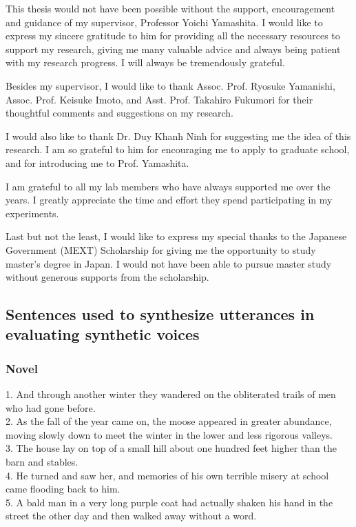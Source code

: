 \documentclass[12pt]{article}
\begin{document}
\clearpage
\acknowledgements
This thesis would not have been possible without the support, encouragement and guidance of my supervisor, Professor Yoichi Yamashita. I would like to express my sincere gratitude to him for providing all the necessary resources to support my research, giving me many valuable advice and always being patient with my research progress. I will always be tremendously grateful.

Besides my supervisor, I would like to thank Assoc. Prof. Ryosuke Yamanishi, Assoc. Prof. Keisuke Imoto, and Asst. Prof. Takahiro Fukumori for their thoughtful comments and suggestions on my research.

I would also like to thank Dr. Duy Khanh Ninh for suggesting me the idea of this research. I am so grateful to him for encouraging me to apply to graduate school, and for introducing me to Prof. Yamashita.

I am grateful to all my lab members who have always supported me over the years. I greatly appreciate the time and effort they spend participating in my experiments.

Last but not the least, I would like to express my special thanks to the Japanese Government (MEXT) Scholarship for giving me the opportunity to study master's degree in Japan. I would not have been able to pursue master study without generous supports from the scholarship.



\newpage



\clearpage
\appendix
\setcounter{secnumdepth}{0}
\subsection{Sentences used to synthesize utterances in evaluating synthetic voices}\label{sec_appendix}

\subsubsection{Novel}
1.	And through another winter they wandered on the obliterated trails of men who had gone before.\\
2.	As the fall of the year came on, the moose appeared in greater abundance, moving slowly down to meet the winter in the lower and less rigorous valleys.\\
3.	The house lay on top of a small hill about one hundred feet higher than the barn and stables.\\
4.	He turned and saw her, and memories of his own terrible misery at school came flooding back to him.\\
5.	A bald man in a very long purple coat had actually shaken his hand in the street the other day and then walked away without a word.
\end{document}
